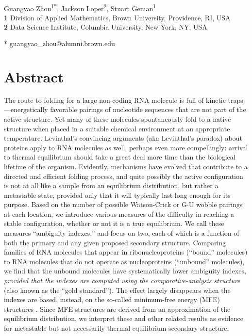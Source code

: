 \documentclass[10pt,letterpaper]{article}
\date{}
\begin{document}
\vspace*{0.2in}


\begin{flushleft}
{\Large
\textbf{} 
}
\newline
\\
Guangyao Zhou\textsuperscript{1*},
Jackson Loper\textsuperscript{2},
Stuart Geman\textsuperscript{1}
\\
\bigskip
\textbf{1} Division of Applied Mathematics, Brown University, Providence, RI, USA
\\
\textbf{2} Data Science Institute, Columbia University, New York, NY, USA
\\
\bigskip

* guangyao\_zhou@alumni.brown.edu

\end{flushleft}

\section*{Abstract}
The route to folding for a large non-coding RNA molecule is full of 
kinetic traps---energetically favorable pairings of nucleotide sequences that are not part of the active structure. Yet many of these molecules spontaneously fold to a native structure when placed in a suitable chemical environment at an appropriate temperature.
Levinthal's convincing arguments\cite{Levinthal1969-hi} (aka Levinthal's paradox) about proteins apply to RNA molecules as well, perhaps even more compellingly: arrival to thermal equilibrium should take a great deal more time than the biological lifetime of the organism. Evidently, mechanisms have evolved that contribute to a directed and efficient folding process, and quite possibly the active configuration is not at all like a sample from an equilibrium distribution, but rather a metastable state, provided only that it will typically last long enough for its purpose. 
Based on the number of possible Watson-Crick or G$\cdot$U wobble pairings at each location, we
introduce various measures of the difficulty in reaching a stable configuration, whether or not it is a true equilibrium.
We call these measures ``ambiguity indexes,'' and focus on two, each of which is a function of both the primary and any given proposed secondary structure. Comparing families of RNA molecules that appear in ribonucleoproteins (``bound'' molecules) to RNA molecules that do not operate as nucleoproteins (``unbound'' molecules), we find that the unbound molecules have systematically lower ambiguity indexes, {\em provided that the indexes are computed using the comparative-analysis \cite{Gutell1992-hu} structure} (also known as the ``gold standard''). The effect largely disappears when the indexes are based, instead, on the so-called minimum-free energy (MFE) structures \cite{Mathews1999-hc,Zuker1999-rc}. Since MFE structures are derived from an approximation of the equilibrium distribution, we interpret these and other related results as evidence for metastable but not necessarily thermal equilibrium secondary structure. 
\end{document}
